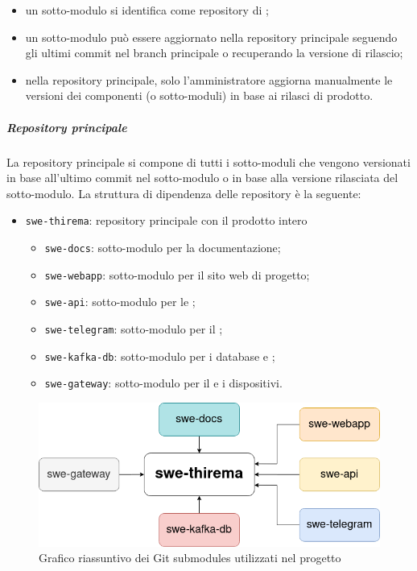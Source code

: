 		\begin{itemize}
			\item un sotto-modulo si identifica come repository di ;
			\item un sotto-modulo può essere aggiornato nella repository principale seguendo gli ultimi commit nel branch principale o recuperando la versione di rilascio;
			\item nella repository principale, solo l'amministratore aggiorna manualmente le versioni dei componenti (o sotto-moduli) in base ai rilasci di prodotto.
		\end{itemize}

		\subparagraph{Repository principale}

		La repository principale si compone di tutti i sotto-moduli che vengono versionati in base all'ultimo commit nel sotto-modulo o in base alla versione rilasciata del sotto-modulo.
		La struttura di dipendenza delle repository è la seguente:

		\begin{itemize}
			\item \verb!swe-thirema!: repository principale con il prodotto intero
			\begin{itemize}
				\item \verb!swe-docs!: sotto-modulo per la documentazione;
				\item \verb!swe-webapp!: sotto-modulo per il sito web di progetto;
				\item \verb!swe-api!: sotto-modulo per le ;
				\item \verb!swe-telegram!: sotto-modulo per il ;
				\item \verb!swe-kafka-db!: sotto-modulo per i database e ;
				\item \verb!swe-gateway!: sotto-modulo per il  e i dispositivi.
			\end{itemize}
		\end{itemize}

		\begin{figure}[H]
			\centering
			\includegraphics[scale=0.7]{res/images/submodules}
			\caption{Grafico riassuntivo dei Git submodules utilizzati nel progetto}
		\end{figure}
		
